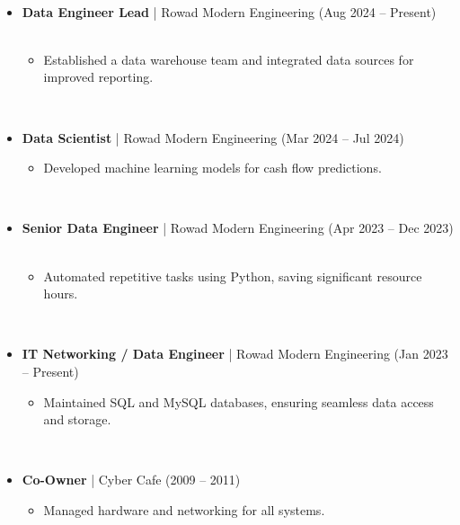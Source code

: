 \documentclass[10pt, letterpaper]{article}
\begin{document}
    \begin{itemize}[leftmargin=*]
        \item \textbf{Data Engineer Lead} | Rowad Modern Engineering (Aug 2024 – Present)
        \begin{itemize}[leftmargin=1cm]
            \item Established a data warehouse team and integrated data sources for improved reporting.
        \end{itemize}
        \item \textbf{Data Scientist} | Rowad Modern Engineering (Mar 2024 – Jul 2024)
        \begin{itemize}[leftmargin=1cm]
            \item Developed machine learning models for cash flow predictions.
        \end{itemize}
        \item \textbf{Senior Data Engineer} | Rowad Modern Engineering (Apr 2023 – Dec 2023)
        \begin{itemize}[leftmargin=1cm]
            \item Automated repetitive tasks using Python, saving significant resource hours.
        \end{itemize}
        \item \textbf{IT Networking / Data Engineer} | Rowad Modern Engineering (Jan 2023 – Present)
        \begin{itemize}[leftmargin=1cm]
            \item Maintained SQL and MySQL databases, ensuring seamless data access and storage.
        \end{itemize}
        \item \textbf{Co-Owner} | Cyber Cafe (2009 – 2011)
        \begin{itemize}[leftmargin=1cm]
            \item Managed hardware and networking for all systems.
        \end{itemize}
    \end{itemize}
\end{document}
